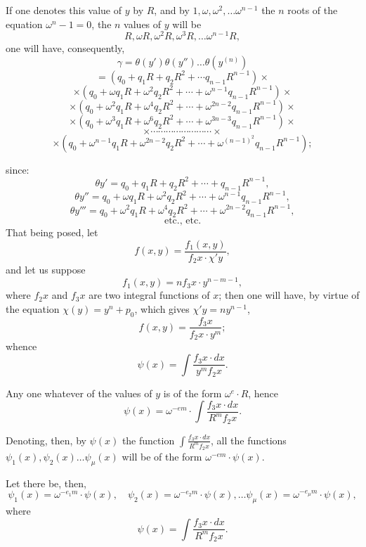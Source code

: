 \documentclass{article}
\begin{document}
If one denotes this value of $y$ by $R$, and by $1, \omega, \omega^{2}, \ldots \omega^{n-1}$ the $n$ roots of the equation $\omega^{n}-1=0$, the $n$ values of $y$ will be
\[ R, \omega R, \omega^{2}R, \omega^{3}R, \ldots \omega^{n-1}R, \tag{124} \]
one will have, consequently,
\[ \gamma = \theta(y')\theta(y'') \ldots \theta(y^{(n)}) \]
\[ = (q_0+q_1 R+q_2 R^{2}+\cdots q_{n-1}R^{n-1}) \times \]
\[ \times (q_0+\omega q_1 R+\omega^{2}q_2 R^{2}+\cdots+\omega^{n-1}q_{n-1}R^{n-1}) \times \]
\[ \times (q_0+\omega^{2}q_1 R+\omega^{4}q_2 R^{2}+\cdots+\omega^{2n-2}q_{n-1}R^{n-1}) \times \]
\[ \times (q_0+\omega^{3}q_1 R+\omega^{6}q_2 R^{2}+\cdots+\omega^{3n-3}q_{n-1}R^{n-1}) \times \]
\[ \times \cdots\cdots\cdots\cdots\cdots\cdots\cdots\cdots \times \]
\[ \times (q_0+\omega^{n-1}q_1 R+\omega^{2n-2}q_2 R^{2}+\cdots+\omega^{(n-1)^2}q_{n-1}R^{n-1}); \tag{125} \]

since:
\[ \theta y' = q_0+q_1 R+q_2 R^{2}+\cdots+q_{n-1}R^{n-1}, \]
\[ \theta y'' = q_0+\omega q_1 R+\omega^{2}q_2 R^{2}+\cdots+\omega^{n-1}q_{n-1}R^{n-1}, \]
\[ \theta y''' = q_0+\omega^{2}q_1 R+\omega^{4}q_2 R^{2}+\cdots+\omega^{2n-2}q_{n-1}R^{n-1}, \]
\[ \text{etc., etc.} \tag{126} \]
That being posed, let
\[ f(x, y) = \frac{f_1(x, y)}{f_2 x \cdot \chi' y}, \tag{127} \]
and let us suppose
\[ f_1(x, y) = n f_3 x \cdot y^{n-m-1}, \]
where $f_2 x$ and $f_3 x$ are two integral functions of $x$; then one will have, by virtue of the equation $\chi(y) = y^{n}+p_0$, which gives $\chi' y = n y^{n-1}$,
\[ f(x, y) = \frac{f_3 x}{f_2 x \cdot y^{m}}; \tag{128} \]
whence
\[ \psi(x) = \int \frac{f_3 x \cdot dx}{y^{m} f_2 x}. \tag{129} \]

Any one whatever of the values of $y$ is of the form $\omega^{e} \cdot R$, hence
\[ \psi(x) = \omega^{-em} \cdot \int \frac{f_3 x \cdot dx}{R^{m} f_2 x}. \tag{130} \]

Denoting, then, by $\psi(x)$ the function $\displaystyle\int \frac{f_3 x \cdot dx}{R^{m} f_2 x}$, all the functions $\psi_1(x), \psi_2(x) \ldots \psi_\mu(x)$ will be of the form $\omega^{-em} \cdot \psi(x)$.

Let there be, then,
\[ \psi_1(x) = \omega^{-e_1 m} \cdot \psi(x), \quad \psi_2(x) = \omega^{-e_2 m} \cdot \psi(x), \ldots \psi_\mu(x) = \omega^{-e_\mu m} \cdot \psi(x), \tag{131} \]
where
\[ \psi(x) = \int \frac{f_3 x \cdot dx}{R^{m} f_2 x}. \]
\end{document}
